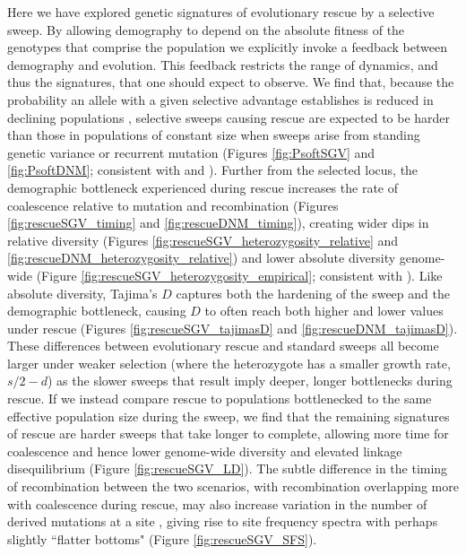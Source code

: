 \documentclass[]{article}
\begin{document}
Here we have explored genetic signatures of evolutionary rescue by a selective sweep. 
By allowing demography to depend on the absolute fitness of the genotypes that comprise the population we explicitly invoke a feedback between demography and evolution.
This feedback restricts the range of dynamics, and thus the signatures, that one should expect to observe.
We find that, because the probability an allele with a given selective advantage establishes is reduced in declining populations \citep[Equation \ref{eq:pest}; see also][]{otto1997probability}, selective sweeps causing rescue are expected to be harder than those in populations of constant size when sweeps arise from standing genetic variance or recurrent mutation (Figures \ref{fig:PsoftSGV} and \ref{fig:PsoftDNM}; consistent with \citealp{wilson2014soft} and \citealp{wilson2017soft}).
Further from the selected locus, the demographic bottleneck experienced during rescue increases the rate of coalescence relative to mutation and recombination (Figures \ref{fig:rescueSGV_timing} and \ref{fig:rescueDNM_timing}), creating wider dips in relative diversity (Figures \ref{fig:rescueSGV_heterozygosity_relative} and \ref{fig:rescueDNM_heterozygosity_relative}) and lower absolute diversity genome-wide (Figure \ref{fig:rescueSGV_heterozygosity_empirical}; consistent with \citealp{innan2004pattern}). 
Like absolute diversity, Tajima's $D$ captures both the hardening of the sweep and the demographic bottleneck, causing $D$ to often reach both higher and lower values under rescue (Figures \ref{fig:rescueSGV_tajimasD} and \ref{fig:rescueDNM_tajimasD}).
These differences between evolutionary rescue and standard sweeps all become larger under weaker selection (where the heterozygote has a smaller growth rate, $s/2-d$) as the slower sweeps that result imply deeper, longer bottlenecks during rescue.
If we instead compare rescue to populations bottlenecked to the same effective population size during the sweep, we find that the remaining signatures of rescue are harder sweeps that take longer to complete, allowing more time for coalescence and hence lower genome-wide diversity and elevated linkage disequilibrium (Figure \ref{fig:rescueSGV_LD}).
The subtle difference in the timing of recombination between the two scenarios, with recombination overlapping more with coalescence during rescue, may also increase variation in the number of derived mutations at a site \citep[as expected following soft sweeps from recurrent mutation in populations of constant size;][]{pennings2006soft}, giving rise to site frequency spectra with perhaps slightly ``flatter bottoms" (Figure \ref{fig:rescueSGV_SFS}).
\end{document}
